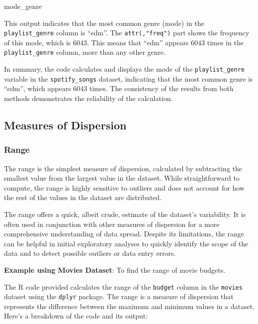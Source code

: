 \documentclass[
]{book}
\newenvironment{Shaded}{\begin{snugshade}}{\end{snugshade}}
\newcommand{\NormalTok}[1]{#1}
\begin{document}
\begin{Shaded}
\begin{Highlighting}[]
\NormalTok{mode\_genre}
\end{Highlighting}
\end{Shaded}

This output indicates that the most common genre (mode) in the \texttt{playlist\_genre} column is ``edm''. The \texttt{attr(,"freq")} part shows the frequency of this mode, which is 6043. This means that ``edm'' appears 6043 times in the \texttt{playlist\_genre} column, more than any other genre.

In summary, the code calculates and displays the mode of the \texttt{playlist\_genre} variable in the \texttt{spotify\_songs} dataset, indicating that the most common genre is ``edm'', which appears 6043 times. The consistency of the results from both methods demonstrates the reliability of the calculation.

\hypertarget{measures-of-dispersion}{%
\subsection*{Measures of Dispersion}\label{measures-of-dispersion}}

\hypertarget{range}{%
\subsubsection*{Range}\label{range}}

The range is the simplest measure of dispersion, calculated by subtracting the smallest value from the largest value in the dataset. While straightforward to compute, the range is highly sensitive to outliers and does not account for how the rest of the values in the dataset are distributed.

The range offers a quick, albeit crude, estimate of the dataset's variability. It is often used in conjunction with other measures of dispersion for a more comprehensive understanding of data spread. Despite its limitations, the range can be helpful in initial exploratory analyses to quickly identify the scope of the data and to detect possible outliers or data entry errors.

\textbf{Example using Movies Dataset}: To find the range of movie budgets.

The R code provided calculates the range of the \texttt{budget} column in the \texttt{movies} dataset using the \texttt{dplyr} package. The range is a measure of dispersion that represents the difference between the maximum and minimum values in a dataset. Here's a breakdown of the code and its output:
\end{document}
